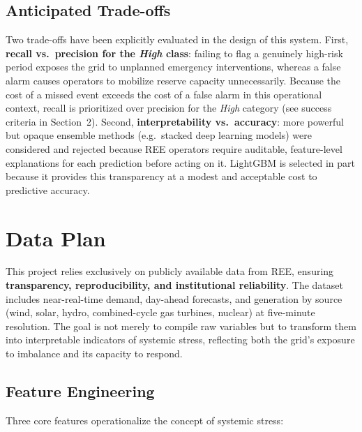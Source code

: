 \documentclass[11pt, a4paper]{article}
\begin{document}
\subsection{Anticipated Trade-offs}

Two trade-offs have been explicitly evaluated in the design of this system.
First, \textbf{recall vs.\ precision for the \textit{High} class}: failing to flag a
genuinely high-risk period exposes the grid to unplanned emergency
interventions, whereas a false alarm causes operators to mobilize reserve
capacity unnecessarily. Because the cost of a missed event exceeds the cost
of a false alarm in this operational context, recall is prioritized over
precision for the \textit{High} category (see success criteria in Section~2).
Second, \textbf{interpretability vs.\ accuracy}: more powerful but opaque
ensemble methods (e.g.\ stacked deep learning models) were considered and
rejected because REE operators require auditable, feature-level explanations
for each prediction before acting on it. LightGBM is selected in part
because it provides this transparency at a modest and acceptable cost to
predictive accuracy.

\section{Data Plan}

This project relies exclusively on publicly available data from REE, ensuring \textbf{transparency, reproducibility, and institutional reliability}. The dataset includes near-real-time demand, day-ahead forecasts, and generation by source (wind, solar, hydro, combined-cycle gas turbines, nuclear) at five-minute resolution. The goal is not merely to compile raw variables but to transform them into interpretable indicators of systemic stress, reflecting both the grid's exposure to imbalance and its capacity to respond.

\subsection{Feature Engineering}

Three core features operationalize the concept of systemic stress:
\end{document}
